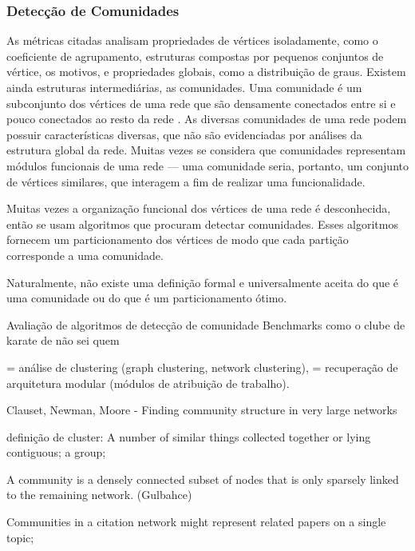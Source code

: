 ﻿\documentclass{article}
\begin{document}

\subsubsection{Detecção de Comunidades}

As métricas citadas analisam propriedades de vértices isoladamente, como o coeficiente de agrupamento, estruturas compostas por pequenos conjuntos de vértice, os motivos, e propriedades globais, como a distribuição de graus. Existem ainda estruturas intermediárias, as comunidades. Uma comunidade é um subconjunto dos vértices de uma rede que são densamente conectados entre si e pouco conectados ao resto da rede \cite{Gulbahce2008}. As diversas comunidades de uma rede podem possuir características diversas, que não são evidenciadas por análises da estrutura global da rede. Muitas vezes se considera que comunidades representam módulos funcionais de uma rede --- uma comunidade seria, portanto, um conjunto de vértices similares, que interagem a fim de realizar uma funcionalidade.

Muitas vezes a organização funcional dos vértices de uma rede é desconhecida, então se usam algoritmos que procuram detectar comunidades. Esses algoritmos fornecem um particionamento dos vértices de modo que cada partição corresponde a uma comunidade.

Naturalmente, não existe uma definição formal e universalmente aceita do que é uma comunidade ou do que é um particionamento ótimo. 

Avaliação de algoritmos de detecção de comunidade
Benchmarks como o clube de karate de não sei quem

= análise de clustering (graph clustering, network clustering), = recuperação de arquitetura modular (módulos de atribuição de trabalho).

Clauset, Newman, Moore - Finding community structure in very large networks \cite{Clauset2004}

definição de cluster: A number of similar things collected together or lying contiguous; a group;

A community is
a densely connected subset of nodes that is only sparsely
linked to the remaining network. (Gulbahce)

Communities in a citation network might represent
related papers on a single topic;
\end{document}
